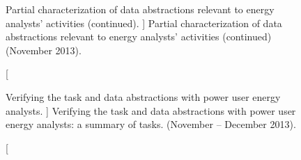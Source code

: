 

\begin{figure}
	\centering
	\caption
	[
	    Partial characterization of data abstractions relevant to energy analysts' activities (continued).
	]
	{
    	Partial characterization of data abstractions relevant to energy analysts' activities (continued) (November 2013).  
	}
	\centering
	\label{app:emu:fig:data-2}
\end{figure}



\begin{figure}
	\centering
	\caption
	[
	    Verifying the task and data abstractions with power user energy analysts.
	]
	{
    	Verifying the task and data abstractions with power user energy analysts: a summary of tasks. (November -- December 2013).  
	}
	\centering
	\label{app:emu:fig:verify}
\end{figure}

